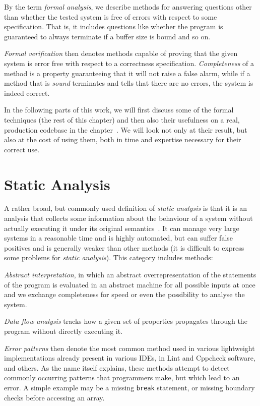 By the term {\em formal analysis}, we describe methods for answering questions other than whether the tested system is free of errors with respect to some specification. That is, it includes questions like whether the program is guaranteed to always terminate if a buffer size is bound and so on.

{\em Formal verification} then denotes methods capable of proving that the
given system is error free with respect to a correctness specification. {\em
Completeness} of a method is a property guaranteeing that it will not raise
a false alarm, while if a method that is {\em sound} terminates and tells
that there are no errors, the system is indeed correct.

In the following parts of this work, we will first discuss some of the
formal techniques (the rest of this chapter) and then also their usefulness
on a real, production codebase in the chapter~. We
will look not only at their result, but also at the cost of using them,
both in time and expertise necessary for their correct use.

\section{Static Analysis}\label{chap:fav:staticAnalysis}
A rather broad, but commonly used definition of {\em static analysis} is
that it is an analysis that collects some information about the behaviour
of a system without actually executing it under its original
semantics~\cite[Chap. 2.2]{KrenaVojnarOverview}. It can manage very large
systems in a reasonable time and is highly automated, but can suffer false
positives and is generally weaker than other methods (it is difficult to
express some problems for {\em static analysis}). This category includes
methods:

{\em Abstract interpretation}, in which an abstract overrepresentation of the statements of the program is evaluated in an abstract machine for all possible inputs at once and we exchange completeness for speed or even the possibility to analyse the system.

{\em Data flow analysis} tracks how a given set of properties propagates through the program without directly executing it.

{\em Error patterns} then denote the most common method used in various
lightweight implementations already present in various IDEs, in Lint and
Cppcheck software, and others. As the name itself explains, these methods
attempt to detect commonly occurring patterns that programmers make, but
which lead to an error. A simple example may be a missing {\tt break}
statement, or missing boundary checks before accessing an array.

